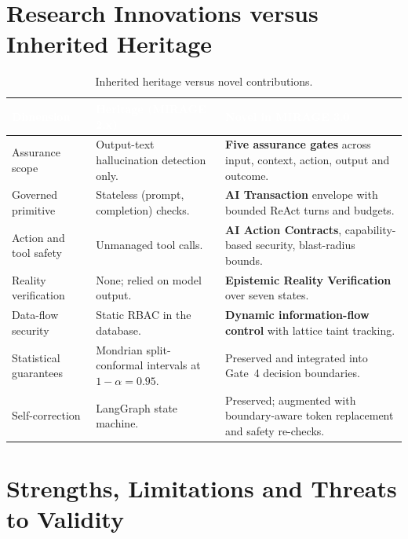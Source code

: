 \documentclass[11pt,a4paper]{article}
\newcommand{\hc}[1]{\textcolor{white}{\textbf{#1}}}
\newcommand{\hdrrow}{\rowcolor{primarynavy}}
\begin{document}
\section{Research Innovations versus Inherited Heritage}
\begin{table}[!htbp]
\centering\small
\renewcommand{\arraystretch}{1.2}
\begin{tabularx}{\linewidth}{@{}L{3.4cm} L{4.5cm} Y@{}}
\hdrrow \hc{Dimension} & \hc{Heritage (MIRAGE 2.x)} & \hc{Novel in MIRAGE 3.0}\\
\toprule
Assurance scope & Output-text hallucination detection only. & \textbf{Five assurance gates} across input, context, action, output and outcome.\\
Governed primitive & Stateless (prompt, completion) checks. & \textbf{AI Transaction} envelope with bounded ReAct turns and budgets.\\
Action and tool safety & Unmanaged tool calls. & \textbf{AI Action Contracts}, capability-based security, blast-radius bounds.\\
Reality verification & None; relied on model output. & \textbf{Epistemic Reality Verification} over seven states.\\
Data-flow security & Static RBAC in the database. & \textbf{Dynamic information-flow control} with lattice taint tracking.\\
Statistical guarantees & Mondrian split-conformal intervals at $1-\alpha=0.95$. & Preserved and integrated into Gate~4 decision boundaries.\\
Self-correction & LangGraph state machine. & Preserved; augmented with boundary-aware token replacement and safety re-checks.\\
\bottomrule
\end{tabularx}
\caption{Inherited heritage versus novel contributions.}
\label{tab:innovations}
\end{table}

\section{Strengths, Limitations and Threats to Validity}
\end{document}
